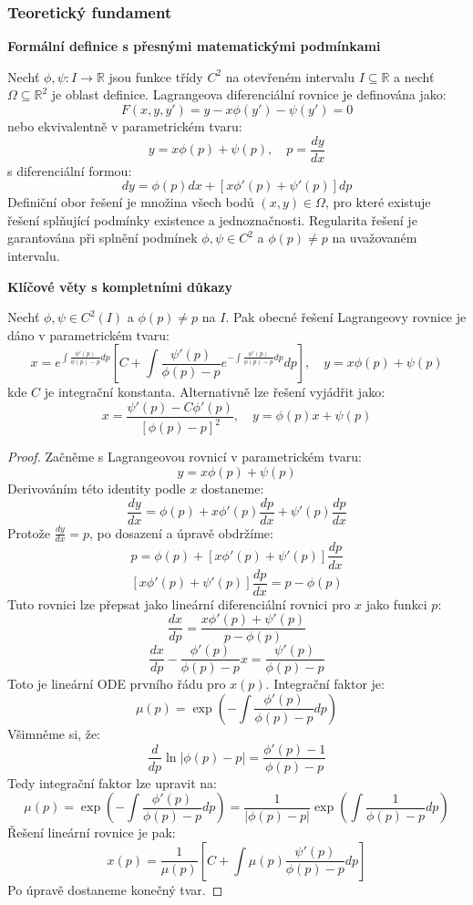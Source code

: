 \subsubsection{Teoretický fundament}
\label{subsubsec:teorie-lagrange}

\noindent\textbf{Formální definice s přesnými matematickými podmínkami}

Nechť $\phi, \psi: I \to \mathbb{R}$ jsou funkce třídy $C^2$ na otevřeném intervalu $I \subseteq \mathbb{R}$ a nechť $\Omega \subseteq \mathbb{R}^2$ je oblast definice. Lagrangeova diferenciální rovnice je definována jako:
\[
F(x, y, y') = y - x\phi(y') - \psi(y') = 0
\]
nebo ekvivalentně v parametrickém tvaru:
\[
y = x\phi(p) + \psi(p), \quad p = \frac{dy}{dx}
\]
s diferenciální formou:
\[
dy = \phi(p)dx + [x\phi'(p) + \psi'(p)]dp
\]
Definiční obor řešení je množina všech bodů $(x, y) \in \Omega$, pro které existuje řešení splňující podmínky existence a jednoznačnosti. Regularita řešení je garantována při splnění podmínek $\phi, \psi \in C^2$ a $\phi(p) \neq p$ na uvažovaném intervalu.

\vspace{1\baselineskip}

\noindent\textbf{Klíčové věty s kompletními důkazy}

\begin{theorem}
Nechť $\phi, \psi \in C^2(I)$ a $\phi(p) \neq p$ na $I$. Pak obecné řešení Lagrangeovy rovnice je dáno v parametrickém tvaru:
\[
x = e^{\int \frac{\phi'(p)}{\phi(p)-p} dp} \left[ C + \int \frac{\psi'(p)}{\phi(p)-p} e^{-\int \frac{\phi'(p)}{\phi(p)-p} dp} dp \right], \quad y = x\phi(p) + \psi(p)
\]
kde $C$ je integrační konstanta. Alternativně lze řešení vyjádřit jako:
\[
x = \frac{\psi'(p) - C\phi'(p)}{[\phi(p) - p]^2}, \quad y = \phi(p)x + \psi(p)
\]
\end{theorem}

\begin{proof}
Začněme s Lagrangeovou rovnicí v parametrickém tvaru:
\[
y = x\phi(p) + \psi(p)
\]
Derivováním této identity podle $x$ dostaneme:
\[
\frac{dy}{dx} = \phi(p) + x\phi'(p)\frac{dp}{dx} + \psi'(p)\frac{dp}{dx}
\]
Protože $\frac{dy}{dx} = p$, po dosazení a úpravě obdržíme:
\[
p = \phi(p) + [x\phi'(p) + \psi'(p)]\frac{dp}{dx}
\]
\[
[x\phi'(p) + \psi'(p)]\frac{dp}{dx} = p - \phi(p)
\]
Tuto rovnici lze přepsat jako lineární diferenciální rovnici pro $x$ jako funkci $p$:
\[
\frac{dx}{dp} = \frac{x\phi'(p) + \psi'(p)}{p - \phi(p)}
\]
\[
\frac{dx}{dp} - \frac{\phi'(p)}{\phi(p) - p}x = \frac{\psi'(p)}{\phi(p) - p}
\]
Toto je lineární ODE prvního řádu pro $x(p)$. Integrační faktor je:
\[
\mu(p) = \exp\left(-\int \frac{\phi'(p)}{\phi(p) - p} dp\right)
\]
Všimněme si, že:
\[
\frac{d}{dp} \ln|\phi(p) - p| = \frac{\phi'(p) - 1}{\phi(p) - p}
\]
Tedy integrační faktor lze upravit na:
\[
\mu(p) = \exp\left(-\int \frac{\phi'(p)}{\phi(p) - p} dp\right) = \frac{1}{|\phi(p) - p|} \exp\left(\int \frac{1}{\phi(p) - p} dp\right)
\]
Řešení lineární rovnice je pak:
\[
x(p) = \frac{1}{\mu(p)} \left[ C + \int \mu(p) \frac{\psi'(p)}{\phi(p) - p} dp \right]
\]
Po úpravě dostaneme konečný tvar.
\end{proof}


